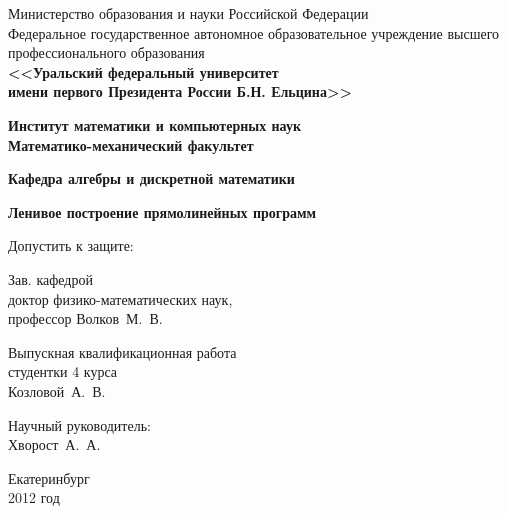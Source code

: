 \documentclass[12pt]{article}
\begin{document}
{\thispagestyle{empty}
\begin{center}
\scriptsize Министерство образования и науки Российской Федерации\\
\scriptsize Федеральное государственное автономное образовательное учреждение высшего профессионального образования\\
\small\bf <<Уральский федеральный университет\\
\small\bf имени первого Президента России Б.Н. Ельцина>>
\end{center}

\begin{center}
\normalsize\bf Институт математики и компьютерных наук\\
\normalsize\bf Математико-механический факультет\\
\end{center}
\begin{center}
\normalsize\bf Кафедра алгебры и дискретной математики\\
\end{center}

\vspace{3cm}

\begin{center}
\Large\bf Ленивое построение прямолинейных программ
\end{center}

\vspace{3.5cm}

\hspace{-1cm}
\begin{minipage}{80mm}
 \noindent
 \vspace{-2.3cm}
	\begin{flushleft}
		\normalsize Допустить к защите:\\
	\end{flushleft}
	
	\begin{flushleft}
		\normalsize Зав. кафедрой\\
		\normalsize доктор физико-математических наук,\\
		\normalsize профессор Волков~М.~В.
	\end{flushleft}
\end{minipage}
\begin{minipage}{85mm}
	\begin{flushright}
		\normalsize Выпускная квалификационная работа\\
		\normalsize студентки 4 курса\\
		\normalsize Козловой~А.~В.
	\end{flushright}
	
	\vspace{0.5cm}
	
	\begin{flushright}
		\normalsize Научный руководитель:\\
		\normalsize Хворост~А.~А.
	\end{flushright}
\end{minipage}

\vspace{4cm}

\begin{center}
Екатеринбург\\
2012 год
\end{center}

}
\end{document}
